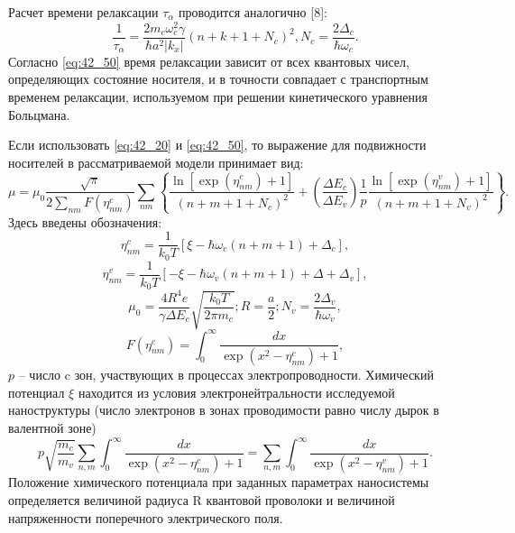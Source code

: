 Расчет времени релаксации $\tau _{\alpha } $ проводится аналогично [8]:
\begin{equation} \label{eq:42_50}
\frac{1}{\tau _{\alpha } } =\frac{2m_{c} \omega _{c}^{2} \gamma }{\hbar a^{2} \left|k_{x} \right|} \left(n+k+1+N_{c} \right)^{2} , N_{c} =\frac{2\Delta _{c} }{\hbar \omega _{c} } .
\end{equation} 
Согласно \eqref{eq:42_50} время релаксации зависит от всех квантовых чисел, определяющих состояние носителя, и в точности совпадает с транспортным временем релаксации, используемом при решении кинетического уравнения Больцмана.

Если использовать \eqref{eq:42_20} и \eqref{eq:42_50}, то выражение для подвижности носителей в рассматриваемой модели принимает вид:
\begin{equation} \label{eq:42_60}
\mu =\mu _{0} \frac{\sqrt{\pi } }{2\sum _{nm}F(\eta _{nm}^{c} ) } \sum _{nm}\left\{\frac{\ln \left[\exp \left(\eta _{nm}^{c} \right)+1\right]}{\left(n+m+1+N_{c} \right)^{2} } +\left(\frac{\Delta E_{c} }{\Delta E_{v} } \right)\frac{1}{p} \frac{\ln \left[\exp \left(\eta _{nm}^{v} \right)+1\right]}{\left(n+m+1+N_{v} \right)^{2} } \right\} . 
\end{equation} 
Здесь введены обозначения:
\[
\eta _{nm}^{c} =\frac{1}{k_{0} T} \left[\xi -\hbar \omega _{c} \left(n+m+1\right)+\Delta _{c} \right],\] 
\[\eta _{nm}^{v} =\frac{1}{k_{0} T} \left[-\xi -\hbar \omega _{v} \left(n+m+1\right)+\Delta +\Delta _{v} \right],
\] 
\[
\mu _{0} =\frac{4R^{4} e}{\gamma \Delta E_{c} } \sqrt{\frac{k_{0} T}{2\pi m_{c} } } ; R=\frac{a}{2} ; N_{v} =\frac{2\Delta _{v} }{\hbar \omega _{v} } ,
\] 
\[
F(\eta _{nm}^{c} )=\int _{0}^{\infty }\frac{dx}{\exp \left(x^{2} -\eta _{nm}^{c} \right)+1}  ,
\] 
$p$ -- число c зон, участвующих в процессах электропроводности. Химический потенциал $\xi $ находится из условия электронейтральности исследуемой наноструктуры (число электронов в зонах проводимости равно числу дырок в валентной зоне)
\begin{equation} \label{eq:42_70}
p\sqrt{\frac{m_{c} }{m_{v} } } \sum _{n,m}\int _{0}^{\infty }\frac{dx}{\exp \left(x^{2} -\eta _{nm}^{c} \right)+1}   =\sum _{n,m}\int _{0}^{\infty }\frac{dx}{\exp \left(x^{2} -\eta _{nm}^{v} \right)+1}. 
\end{equation} 
Положение химического потенциала при заданных параметрах наносистемы определяется величиной радиуса R квантовой проволоки и величиной напряженности поперечного электрического поля.

